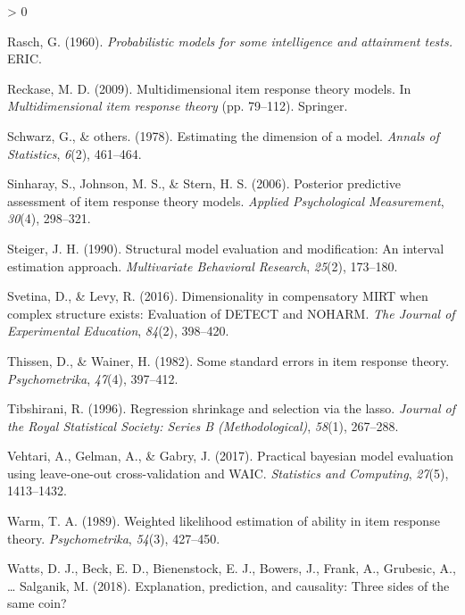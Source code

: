 \documentclass[
  english,
  man,floatsintext]{apa7}
\newlength{\cslhangindent}
\newenvironment{CSLReferences}[2] %
 {%
  \setlength{\parindent}{0pt}
  \ifodd #1 \everypar{\setlength{\hangindent}{\cslhangindent}}\ignorespaces\fi
  \ifnum #2 > 0
  \setlength{\parskip}{#2\baselineskip}
  \fi
 }%
 {}
\begin{document}
\begin{CSLReferences}{1}{0}
\leavevmode\hypertarget{ref-rasch1960probabilistic}{}%
Rasch, G. (1960). \emph{Probabilistic models for some intelligence and attainment tests.} ERIC.

\leavevmode\hypertarget{ref-reckase2009multidimensional}{}%
Reckase, M. D. (2009). Multidimensional item response theory models. In \emph{Multidimensional item response theory} (pp. 79--112). Springer.

\leavevmode\hypertarget{ref-schwarz1978estimating}{}%
Schwarz, G., \& others. (1978). Estimating the dimension of a model. \emph{Annals of Statistics}, \emph{6}(2), 461--464.

\leavevmode\hypertarget{ref-sinharay2006posterior}{}%
Sinharay, S., Johnson, M. S., \& Stern, H. S. (2006). Posterior predictive assessment of item response theory models. \emph{Applied Psychological Measurement}, \emph{30}(4), 298--321.

\leavevmode\hypertarget{ref-steiger1990structural}{}%
Steiger, J. H. (1990). Structural model evaluation and modification: An interval estimation approach. \emph{Multivariate Behavioral Research}, \emph{25}(2), 173--180.

\leavevmode\hypertarget{ref-svetina2016dimensionality}{}%
Svetina, D., \& Levy, R. (2016). Dimensionality in compensatory MIRT when complex structure exists: Evaluation of DETECT and NOHARM. \emph{The Journal of Experimental Education}, \emph{84}(2), 398--420.

\leavevmode\hypertarget{ref-thissen1982some}{}%
Thissen, D., \& Wainer, H. (1982). Some standard errors in item response theory. \emph{Psychometrika}, \emph{47}(4), 397--412.

\leavevmode\hypertarget{ref-tibshirani1996regression}{}%
Tibshirani, R. (1996). Regression shrinkage and selection via the lasso. \emph{Journal of the Royal Statistical Society: Series B (Methodological)}, \emph{58}(1), 267--288.

\leavevmode\hypertarget{ref-vehtari2017practical}{}%
Vehtari, A., Gelman, A., \& Gabry, J. (2017). Practical bayesian model evaluation using leave-one-out cross-validation and WAIC. \emph{Statistics and Computing}, \emph{27}(5), 1413--1432.

\leavevmode\hypertarget{ref-warm1989weighted}{}%
Warm, T. A. (1989). Weighted likelihood estimation of ability in item response theory. \emph{Psychometrika}, \emph{54}(3), 427--450.

\leavevmode\hypertarget{ref-watts2018explanation}{}%
Watts, D. J., Beck, E. D., Bienenstock, E. J., Bowers, J., Frank, A., Grubesic, A., \ldots{} Salganik, M. (2018). Explanation, prediction, and causality: Three sides of the same coin?


\end{CSLReferences}
\end{document}

